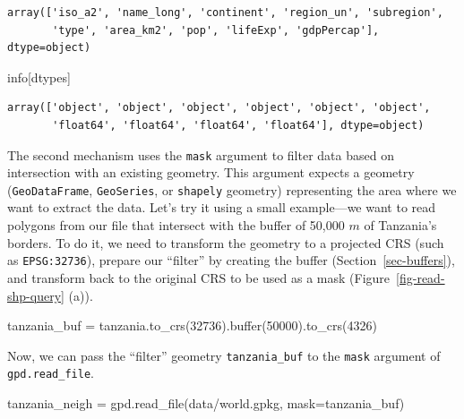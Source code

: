 \documentclass[
  letterpaper,
]{krantz}
\newenvironment{Shaded}{\begin{snugshade}}{\end{snugshade}}
\newcommand{\BuiltInTok}[1]{\textcolor[rgb]{0.00,0.23,0.31}{#1}}
\newcommand{\DecValTok}[1]{\textcolor[rgb]{0.68,0.00,0.00}{#1}}
\newcommand{\NormalTok}[1]{\textcolor[rgb]{0.00,0.23,0.31}{#1}}
\newcommand{\OperatorTok}[1]{\textcolor[rgb]{0.37,0.37,0.37}{#1}}
\newcommand{\StringTok}[1]{\textcolor[rgb]{0.13,0.47,0.30}{#1}}
\begin{document}
\begin{verbatim}
array(['iso_a2', 'name_long', 'continent', 'region_un', 'subregion',
       'type', 'area_km2', 'pop', 'lifeExp', 'gdpPercap'], dtype=object)
\end{verbatim}

\begin{Shaded}
\begin{Highlighting}[]
\NormalTok{info[}\StringTok{\textquotesingle{}dtypes\textquotesingle{}}\NormalTok{]}
\end{Highlighting}
\end{Shaded}

\begin{verbatim}
array(['object', 'object', 'object', 'object', 'object', 'object',
       'float64', 'float64', 'float64', 'float64'], dtype=object)
\end{verbatim}

The second mechanism uses the \texttt{mask} argument to filter data
based on intersection with an existing geometry. This argument expects a
geometry (\texttt{GeoDataFrame}, \texttt{GeoSeries}, or \texttt{shapely}
geometry) representing the area where we want to extract the data. Let's
try it using a small example---we want to read polygons from our file
that intersect with the buffer of 50,000 \(m\) of Tanzania's borders. To
do it, we need to transform the geometry to a projected CRS (such as
\texttt{EPSG:32736}), prepare our ``filter'' by creating the buffer
(Section~\ref{sec-buffers}), and transform back to the original CRS to
be used as a mask (Figure~\ref{fig-read-shp-query} (a)).

\begin{Shaded}
\begin{Highlighting}[]
\NormalTok{tanzania\_buf }\OperatorTok{=}\NormalTok{ tanzania.to\_crs(}\DecValTok{32736}\NormalTok{).}\BuiltInTok{buffer}\NormalTok{(}\DecValTok{50000}\NormalTok{).to\_crs(}\DecValTok{4326}\NormalTok{)}
\end{Highlighting}
\end{Shaded}

Now, we can pass the ``filter'' geometry \texttt{tanzania\_buf} to the
\texttt{mask} argument of \texttt{gpd.read\_file}.

\begin{Shaded}
\begin{Highlighting}[]
\NormalTok{tanzania\_neigh }\OperatorTok{=}\NormalTok{ gpd.read\_file(}\StringTok{\textquotesingle{}data/world.gpkg\textquotesingle{}}\NormalTok{, mask}\OperatorTok{=}\NormalTok{tanzania\_buf)}
\end{Highlighting}
\end{Shaded}
\end{document}
